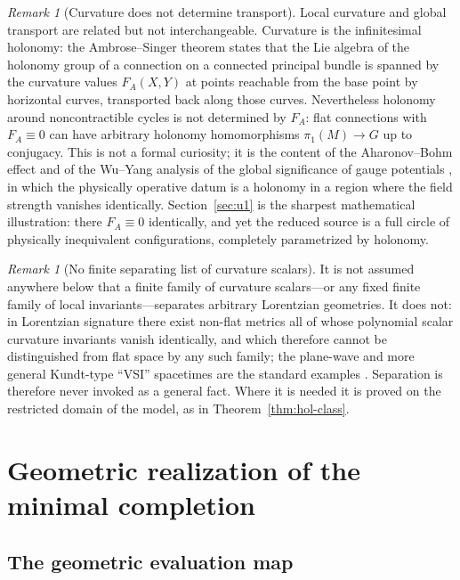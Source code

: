 \documentclass[11pt,a4paper]{article}
\theoremstyle{plain}
\theoremstyle{definition}
\theoremstyle{remark}
\newtheorem{remark}[theorem]{Remark}
\begin{document}
\begin{remark}[Curvature does not determine transport]
\label{rem:curv-vs-hol}
Local curvature and global transport are related but not interchangeable. Curvature is the
infinitesimal holonomy: the Ambrose--Singer theorem \cite{AmbroseSinger,KobayashiNomizu1} states
that the Lie algebra of the holonomy group of a connection on a connected principal bundle is
spanned by the curvature values $F_A(X,Y)$ at points reachable from the base point by horizontal
curves, transported back along those curves. Nevertheless holonomy around noncontractible cycles is
not determined by $F_A$: flat connections with $F_A\equiv 0$ can have arbitrary holonomy
homomorphisms $\pi_1(M)\to G$ up to conjugacy. This is not a formal curiosity; it is the content of
the Aharonov--Bohm effect \cite{AharonovBohm} and of the Wu--Yang analysis of the global
significance of gauge potentials \cite{WuYang}, in which the physically operative datum is a
holonomy in a region where the field strength vanishes identically. Section~\ref{sec:u1} is the
sharpest mathematical illustration: there $F_A\equiv0$ identically, and yet the reduced source is a
full circle of physically inequivalent configurations, completely parametrized by holonomy.
\end{remark}

\begin{remark}[No finite separating list of curvature scalars]
\label{rem:no-finite-separation}
It is not assumed anywhere below that a finite family of curvature scalars---or any fixed finite
family of local invariants---separates arbitrary Lorentzian geometries. It does not: in Lorentzian
signature there exist non-flat metrics all of whose polynomial scalar curvature invariants vanish
identically, and which therefore cannot be distinguished from flat space by any such family; the
plane-wave and more general Kundt-type ``VSI'' spacetimes are the standard examples
\cite{Pravda2002}. Separation is therefore never invoked as a general fact. Where it is needed it
is proved on the restricted domain of the model, as in Theorem~\ref{thm:hol-class}.
\end{remark}

\section{Geometric realization of the minimal completion}
\label{sec:realization}

\subsection{The geometric evaluation map}
\end{document}
